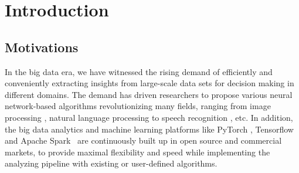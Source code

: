 \documentclass [PhD] {uclathes}
\begin{document}






\chapter{Introduction}


\section{Motivations}
In the big data era, we have witnessed the rising demand of efficiently and conveniently extracting insights  from large-scale data sets for decision making in different domains. The demand has driven researchers to propose various  neural network-based algorithms revolutionizing many fields, ranging from image processing \citep{he2016deep}, natural language processing \citep{devlin2018bert} to speech recognition \citep{amodei2016deep}, etc. In addition, the big data analytics and machine learning platforms like PyTorch \citep{paszke2019pytorch}, Tensorflow~\citep{abadi2016tensorflow} and Apache Spark~\citep{zaharia2010spark} are continuously built up in open source and commercial markets, to provide maximal flexibility and speed while implementing the analyzing pipeline with existing or user-defined algorithms. 
\end{document}
